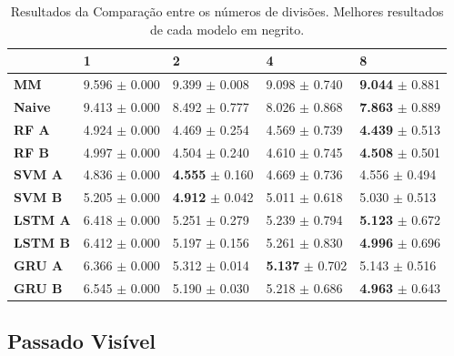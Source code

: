 \begin{table}[htbp]
    \begin{tabular*}{\linewidth}{@{\extracolsep{\fill}}lllll}
    \toprule
     & 
    \multicolumn{1}{l}{\textbf{1}} & 
    \multicolumn{1}{l}{\textbf{2}} &
    \multicolumn{1}{l}{\textbf{4}} &
    \multicolumn{1}{l}{\textbf{8}} \\
    \midrule
    \textbf{MM} & 9.596 $\pm$ 0.000 & 9.399 $\pm$ 0.008 & 9.098 $\pm$ 0.740 & \textbf{9.044} $\pm$ 0.881
    \\
    \midrule
    \textbf{Naive} & 9.413 $\pm$ 0.000 & 8.492 $\pm$ 0.777 & 8.026 $\pm$ 0.868 & \textbf{7.863} $\pm$ 0.889
    \\
    \midrule
    \textbf{RF A} & 4.924 $\pm$ 0.000 & 4.469 $\pm$ 0.254 & 4.569 $\pm$ 0.739 & \textbf{4.439} $\pm$ 0.513
    \\
    \midrule
    \textbf{RF B} & 4.997 $\pm$ 0.000 & 4.504 $\pm$ 0.240 & 4.610 $\pm$ 0.745 & \textbf{4.508} $\pm$ 0.501
    \\
    \midrule
    \textbf{SVM A} & 4.836 $\pm$ 0.000 & \textbf{4.555} $\pm$ 0.160 & 4.669 $\pm$ 0.736 & 4.556 $\pm$ 0.494
    \\
    \midrule
    \textbf{SVM B} & 5.205 $\pm$ 0.000 & \textbf{4.912} $\pm$ 0.042 & 5.011 $\pm$ 0.618 & 5.030 $\pm$ 0.513
    \\
    \midrule
    \textbf{LSTM A} & 6.418 $\pm$ 0.000 & 5.251 $\pm$ 0.279 & 5.239 $\pm$ 0.794 & \textbf{5.123} $\pm$ 0.672
    \\
    \midrule
    \textbf{LSTM B} & 6.412 $\pm$ 0.000 & 5.197 $\pm$ 0.156 & 5.261 $\pm$ 0.830 & \textbf{4.996} $\pm$ 0.696
    \\
    \midrule
    \textbf{GRU A} & 6.366 $\pm$ 0.000 & 5.312 $\pm$ 0.014 & \textbf{5.137} $\pm$ 0.702 & 5.143 $\pm$ 0.516
    \\
    \midrule
    \textbf{GRU B} & 6.545 $\pm$ 0.000 & 5.190 $\pm$ 0.030 & 5.218 $\pm$ 0.686 & \textbf{4.963} $\pm$ 0.643
    \\
    \bottomrule
    \end{tabular*}
    \label{table:res_split}
    \caption{Resultados da Comparação entre os números de divisões. Melhores resultados de cada modelo em negrito.}
\end{table}

\subsection{Passado Visível}


